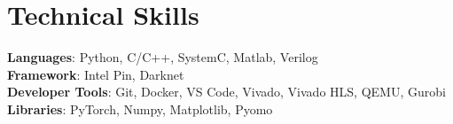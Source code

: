 \documentclass[letterpaper,11pt]{article}
\begin{document}
%
\section{Technical Skills}
 \begin{itemize}[leftmargin=0.15in, label={}]
    \small{\item{
     \textbf{Languages}{: Python, C/C++, SystemC, Matlab, Verilog} \\
     \textbf{Framework}{: Intel Pin, Darknet} \\
     \textbf{Developer Tools}{: Git, Docker, VS Code, Vivado, Vivado HLS, QEMU, Gurobi} \\
     \textbf{Libraries}{: PyTorch, Numpy, Matplotlib, Pyomo}
    }}
 \end{itemize}

\end{document}
